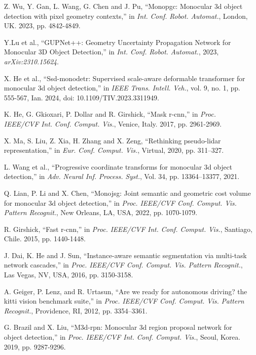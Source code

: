 \documentclass[journal]{IEEEtran}
\begin{document}
\begin{thebibliography}{1}
		Z. Wu, Y. Gan, L. Wang, G. Chen and J. Pu, “Monopgc: Monocular 3d object detection with pixel geometry contexts,” in \textit{Int. Conf. Robot. Automat.}, London, UK. 2023, pp. 4842-4849. 
		
		Y.Lu et al., “GUPNet++: Geometry Uncertainty Propagation Network for Monocular 3D Object Detection,” in \textit{Int. Conf. Robot. Automat.}, 2023, \textit{arXiv:2310.15624}.
		
		X. He et al., “Ssd-monodetr: Supervised scale-aware deformable transformer for monocular 3d object detection,” in \textit{IEEE Trans. Intell. Veh.}, vol. 9, no. 1, pp. 555-567, Ian. 2024, doi: 10.1109/TIV.2023.3311949.
		
		K. He, G. Gkioxari, P. Dollar and R. Girshick, “Mask r-cnn,” in \textit{Proc. IEEE/CVF Int. Conf. Comput. Vis.}, Venice, Italy. 2017, pp. 2961-2969.
		
		X. Ma, S. Liu, Z. Xia, H. Zhang and X. Zeng, “Rethinking pseudo-lidar representation,” in \textit{Eur. Conf. Comput. Vis.}, Virtual, 2020, pp. 311–327.
		
		L. Wang et al., “Progressive coordinate transforms for monocular 3d object detection,” in \textit{Adv. Neural Inf. Process. Syst.}, Vol. 34, pp. 13364--13377, 2021.
		
		Q. Lian, P. Li and X. Chen, “Monojsg: Joint semantic and geometric cost volume for monocular 3d object detection,” in \textit{Proc. IEEE/CVF Conf. Comput. Vis. Pattern Recognit.}, New Orleans, LA, USA, 2022, pp. 1070-1079.
		
		R. Girshick, “Fast r-cnn,” in \textit{Proc. IEEE/CVF Int. Conf. Comput. Vis.}, Santiago, Chile. 2015, pp. 1440-1448.
		
		J. Dai, K. He and J. Sun, “Instance-aware semantic segmentation via multi-task network cascades,” in \textit{Proc. IEEE/CVF Conf. Comput. Vis. Pattern Recognit.}, Las Vegas, NV, USA, 2016, pp. 3150-3158.
	
		A. Geiger, P. Lenz, and R. Urtasun, “Are we ready for autonomous driving? the kitti vision benchmark suite,” in \textit{Proc. IEEE/CVF Conf. Comput. Vis. Pattern Recognit.}, Providence, RI, 2012, pp. 3354–3361.
		
		G. Brazil and X. Liu, “M3d-rpn: Monocular 3d region proposal network for object detection,” in \textit{Proc. IEEE/CVF Int. Conf. Comput. Vis.}, Seoul, Korea. 2019, pp. 9287-9296.
		

\end{thebibliography}
\end{document}

